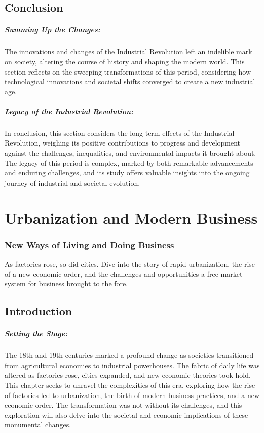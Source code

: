 \documentclass[a4paper,12pt]{book}
\begin{document}
\section*{Conclusion}

\paragraph{Summing Up the Changes:}
The innovations and changes of the Industrial Revolution left an indelible mark on society, altering the course of history and shaping the modern world. This section reflects on the sweeping transformations of this period, considering how technological innovations and societal shifts converged to create a new industrial age.

\paragraph{Legacy of the Industrial Revolution:}
In conclusion, this section considers the long-term effects of the Industrial Revolution, weighing its positive contributions to progress and development against the challenges, inequalities, and environmental impacts it brought about. The legacy of this period is complex, marked by both remarkable advancements and enduring challenges, and its study offers valuable insights into the ongoing journey of industrial and societal evolution.

\chapter{Urbanization and Modern Business}
\subsection*{New Ways of Living and Doing Business}
As factories rose, so did cities. Dive into the story of rapid urbanization, the rise of a new economic order, and the challenges and opportunities a free market system for business brought to the fore.

\section*{Introduction}

\paragraph{Setting the Stage:}
The 18th and 19th centuries marked a profound change as societies transitioned from agricultural economies to industrial powerhouses. The fabric of daily life was altered as factories rose, cities expanded, and new economic theories took hold. This chapter seeks to unravel the complexities of this era, exploring how the rise of factories led to urbanization, the birth of modern business practices, and a new economic order. The transformation was not without its challenges, and this exploration will also delve into the societal and economic implications of these monumental changes.
\end{document}
